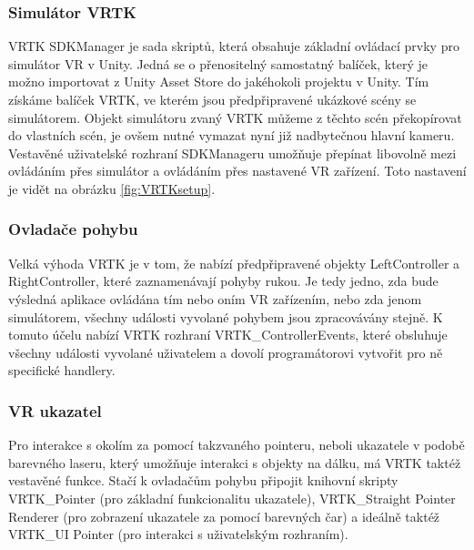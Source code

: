 \documentclass[thesis=B,czech]{FITthesis}[2012/06/26]
\begin{document}
\subsubsection{Simulátor VRTK}
VRTK SDKManager je sada skriptů, která obsahuje základní ovládací prvky pro simulátor VR v Unity. Jedná se o přenositelný samostatný balíček, který je možno importovat z Unity Asset Store do jakéhokoli projektu v Unity. Tím získáme balíček VRTK, ve kterém jsou předpřipravené ukázkové scény se simulátorem. Objekt simulátoru zvaný VRTK můžeme z těchto scén překopírovat do vlastních scén, je ovšem nutné vymazat nyní již nadbytečnou hlavní kameru. Vestavěné uživatelské rozhraní SDKManageru umožňuje přepínat libovolně mezi ovládáním přes simulátor a ovládáním přes nastavené VR zařízení. \cite{VRTK} Toto nastavení je vidět na obrázku \ref{fig:VRTKsetup}.

\subsubsection{Ovladače pohybu}
Velká výhoda VRTK je v tom, že nabízí předpřipravené objekty LeftController a RightController, které zaznamenávají pohyby rukou. Je tedy jedno, zda bude výsledná aplikace ovládána tím nebo oním VR zařízením, nebo zda jenom simulátorem, všechny události vyvolané pohybem jsou zpracovávány stejně. K tomuto účelu nabízí VRTK rozhraní VRTK\_ControllerEvents, které obsluhuje všechny události vyvolané uživatelem a dovolí programátorovi vytvořit pro ně specifické handlery.

\subsubsection{VR ukazatel}
Pro interakce s okolím za pomocí takzvaného pointeru, neboli ukazatele v podobě barevného laseru, který umožňuje interakci s objekty na dálku, má VRTK taktéž vestavěné funkce. Stačí k ovladačům pohybu připojit knihovní skripty VRTK\_Pointer (pro základní funkcionalitu ukazatele), VRTK\_Straight Pointer Renderer (pro zobrazení ukazatele za pomocí barevných čar) a ideálně taktéž VRTK\_UI Pointer (pro interakci s uživatelským rozhraním).
\end{document}
